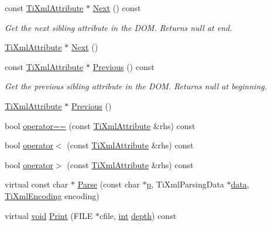 \begin{DoxyCompactItemize}
const \hyperlink{class_ti_xml_attribute}{Ti\-Xml\-Attribute} $\ast$ \hyperlink{class_ti_xml_attribute_a1c78e92e223a40843f644ba48ef69f67}{Next} () const 
\begin{DoxyCompactList}\small\item\em Get the next sibling attribute in the D\-O\-M. Returns null at end. \end{DoxyCompactList}\item 
\hyperlink{class_ti_xml_attribute}{Ti\-Xml\-Attribute} $\ast$ \hyperlink{class_ti_xml_attribute_a138320aa7793b148ba7e5bd0a0ea4db6}{Next} ()
\item 
const \hyperlink{class_ti_xml_attribute}{Ti\-Xml\-Attribute} $\ast$ \hyperlink{class_ti_xml_attribute_a6ebbfe333fe76cd834bd6cbcca3130cf}{Previous} () const 
\begin{DoxyCompactList}\small\item\em Get the previous sibling attribute in the D\-O\-M. Returns null at beginning. \end{DoxyCompactList}\item 
\hyperlink{class_ti_xml_attribute}{Ti\-Xml\-Attribute} $\ast$ \hyperlink{class_ti_xml_attribute_ae4dabc932cba945ed1e92fec5f121193}{Previous} ()
\item 
bool \hyperlink{class_ti_xml_attribute_ae48c2a65b520d453914ce4e845d607cf}{operator==} (const \hyperlink{class_ti_xml_attribute}{Ti\-Xml\-Attribute} \&rhs) const 
\item 
bool \hyperlink{class_ti_xml_attribute_adb8b6f2cad5948e73e383182e7ce10de}{operator$<$} (const \hyperlink{class_ti_xml_attribute}{Ti\-Xml\-Attribute} \&rhs) const 
\item 
bool \hyperlink{class_ti_xml_attribute_a867562769ef9778c1690cd373246b05b}{operator$>$} (const \hyperlink{class_ti_xml_attribute}{Ti\-Xml\-Attribute} \&rhs) const 
\item 
virtual const char $\ast$ \hyperlink{class_ti_xml_attribute_a1437efc74bb8d49da5290772202b5e68}{Parse} (const char $\ast$\hyperlink{glew_8h_aa5367c14d90f462230c2611b81b41d23}{p}, Ti\-Xml\-Parsing\-Data $\ast$\hyperlink{fmod__codec_8h_a42c2b1d86fa71a425e73a882cb0a72c8}{data}, \hyperlink{tinyxml_8h_a88d51847a13ee0f4b4d320d03d2c4d96}{Ti\-Xml\-Encoding} encoding)
\item 
virtual \hyperlink{wglew_8h_aeea6e3dfae3acf232096f57d2d57f084}{void} \hyperlink{class_ti_xml_attribute_acc04956c1d5c4c31fe74f7a7528d109a}{Print} (F\-I\-L\-E $\ast$cfile, \hyperlink{wglew_8h_a500a82aecba06f4550f6849b8099ca21}{int} \hyperlink{glew_8h_a1c814629538debe12a7bfe2509a3671e}{depth}) const 

\end{DoxyCompactItemize}
